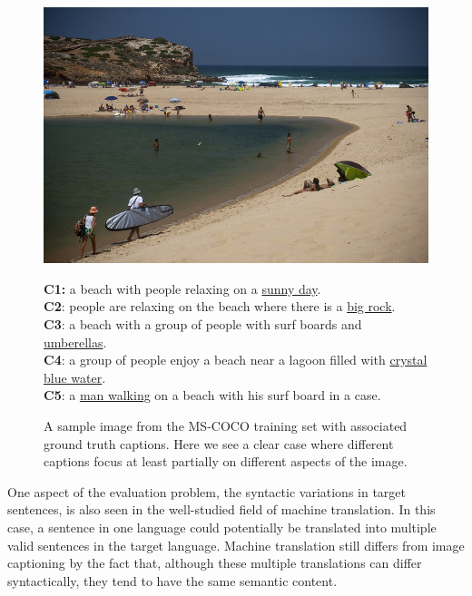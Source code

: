 \begin{figure}[t]
    \begin{minipage}[c]{0.45\linewidth}
            \includegraphics[width=\textwidth]{images/COCO_train2014_000000440903.jpg}
    \end{minipage}\hfill
    \begin{minipage}[c]{0.52\linewidth}
            \textbf{C1:} a beach with people relaxing on a \underline{sunny day}. \\
            \textbf{C2}: people are relaxing on the beach where there is a \underline{big rock}. \\
            \textbf{C3}: a beach with a group of people with surf boards and \underline{umberellas}. \\
            \textbf{C4}: a group of people enjoy a beach near a lagoon filled with \underline{crystal blue
            water}. \\
            \textbf{C5}: a \underline{man walking} on a beach with his surf board in a case. \\
    \end{minipage}
  \vspace*{-3mm}
  \caption{A sample image from the MS-COCO training set with associated ground
  truth captions. Here we see a clear case where different captions focus at
  least partially on different aspects of the image.}
  \label{fig_capdiversity}
\end{figure}

One aspect of the evaluation problem, the syntactic variations in target
sentences, is also seen in the well-studied field of machine translation.
In this case, a sentence in one language could potentially be translated into
multiple valid sentences in the target language.
Machine translation still differs from image captioning by the fact that,
although these multiple translations can differ syntactically, they tend to
have the same semantic content.

